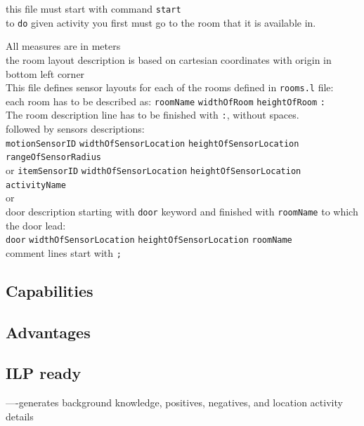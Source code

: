 \documentclass[12pt, a4paper, pdflatex, leqno, twoside, openright]{report}
\begin{document}
this file must start with command \texttt{start}\\
to \texttt{do} given activity you first must go to the room that it is available in.

All measures are in meters\\
the room layout description is based on cartesian coordinates with origin in bottom left corner\\

This file defines sensor layouts for each of the rooms defined in \texttt{rooms.l} file:\\
% 

each room has to be described as:
\texttt{roomName} \texttt{widthOfRoom} \texttt{heightOfRoom} \texttt{:}\\
The room description line has to be finished with \texttt{:}, without spaces.\\

followed by sensors descriptions:\\
\texttt{motionSensorID} \texttt{widthOfSensorLocation} \texttt{heightOfSensorLocation} \texttt{rangeOfSensorRadius}\\
or
\texttt{itemSensorID} \texttt{widthOfSensorLocation} \texttt{heightOfSensorLocation} \texttt{activityName}\\
or\\
door description starting with \texttt{door} keyword and finished with \texttt{roomName} to which the door lead:\\
\texttt{door} \texttt{widthOfSensorLocation} \texttt{heightOfSensorLocation} \texttt{roomName}\\

comment lines start with \texttt{;}\\

    \subsection{Capabilities}
    \subsection{Advantages}
    \subsection{ILP ready}
----generates background knowledge, positives, negatives, and location activity details
\end{document}
